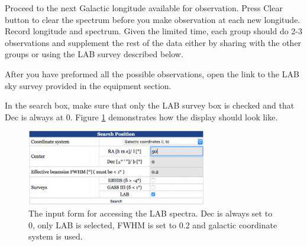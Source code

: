 \begin{steps}
	\item Proceed to the next Galactic longitude available for observation. Press Clear button to clear the spectrum before you make observation at
	each new longitude. Record longitude and spectrum. Given the limited time, each group should do 2-3 observations and supplement the rest of the data either by sharing with the other groups or using the LAB survey described below.%
	
	\item After you have preformed all the possible observations, open the link to the LAB sky survey provided in the equipment section. 
	
	\item In the search box, make sure that only the LAB survey box is checked and that Dec is always at 0. Figure \ref{sgr:fig:lab-box} demonstrates how the display should look like.
\end{steps}

\begin{figure}
	\centering
	\includegraphics[width = 0.7\textwidth]{srt-galaxy-rotation/LAB_box}
	\caption{The input form for accessing the LAB spectra. Dec is always set to 0, only LAB is selected, FWHM is set to 0.2 and galactic coordinate system is used.} 
	\label{sgr:fig:lab-box}
\end{figure}

